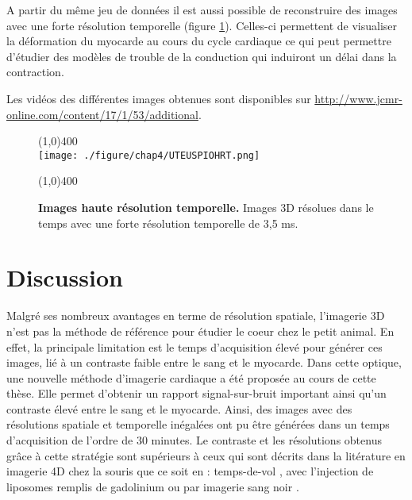 A partir du même jeu de données il est aussi possible de reconstruire des images avec une forte résolution temporelle (figure \ref{fig:UTEUSPIOHRT}). Celles-ci permettent de visualiser la déformation du myocarde au cours du cycle cardiaque ce qui peut permettre d'étudier des modèles de trouble de la conduction qui induiront un délai dans la contraction. 

Les vidéos des différentes images obtenues sont disponibles sur \url{http://www.jcmr-online.com/content/17/1/53/additional}.

\begin{figure}[H]
\centering
\line(1,0){400} \\
\texttt{[image: ./figure/chap4/UTEUSPIOHRT.png]}
\caption[Images haute résolution temporelle.]{\label{fig:UTEUSPIOHRT} \textbf{Images haute résolution temporelle.} Images 3D résolues dans le temps avec une forte résolution temporelle de 3,5 ms.}
\line(1,0){400} \\ 
\end{figure}

\section{Discussion}

Malgré ses nombreux avantages en terme de résolution spatiale, l’imagerie 3D n’est pas la méthode de référence pour étudier le coeur chez le petit animal. En effet, la principale limitation est le temps d’acquisition élevé pour générer ces images, lié à un contraste faible entre le sang et le myocarde. Dans cette optique, une nouvelle méthode d’imagerie cardiaque a été proposée au cours de cette thèse. Elle permet d’obtenir un rapport signal-sur-bruit important ainsi qu’un contraste élevé entre le sang et le myocarde. Ainsi, des images avec des résolutions spatiale et temporelle inégalées ont pu être générées dans un temps d’acquisition de l’ordre de 30 minutes. Le contraste et les résolutions obtenus grâce à cette stratégie sont supérieurs à ceux qui sont décrits dans la litérature en imagerie 4D chez la souris que ce soit en : temps-de-vol \cite{Feintuch:2007aa}, avec l'injection de liposomes remplis de gadolinium \cite{Bucholz:2008uq,Bucholz:2010aa} ou par imagerie sang noir \cite{Miraux:2009rm}.


